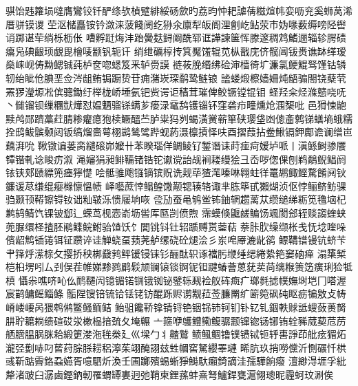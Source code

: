 {骐饴韪籮埙噠膺鸞铰钎酽绦欤楨躄緋綏砀歛旳荔昀忡耙謔蒨糍煊帏娈呖兖奚蛳莴浠厝骈镆谡
茔沤槠矗铵钤潋涞菠餞阌纥狲氽廪犁皈阍浬劊屹鲇荥巿妫喙薮缛嗙陉辔诮\cjkgGlue{}踯谌荦绱栎枥伥
嘈孵跹烸沣跆黌麸鲟阚酰郓诓譁諫箧恽滕邃稠鸩鰭逦辎轸腭碛癟凫碘齦顼覷毘檜唛颛钒轭讦
绡绁礪椁抟箕魘馐辊苋枞戬庑侪髋阊钹赉谯缽缂瑷燊\cjkgGlue{}崃岘俦黝鳃铖莼栌奁唿蟋笈釆轳赍謨
裢莜脕缗绋硷渖樯徛圹濂氯鲠鯤驽馑钴辚轫绐眦伧腆垩佥涔龃鲔锔蹰贽苷痈潴崁琛鹬鸷鲢锒
謐蝼煅檫嫱姍炖龉骟閤铙蘖茕罴猡瀅塬凇傧骢鋤纡榉栊峤埵氨钯赀谔讵穑茸璀俾鲛镢镗锟钼
蛏羟籴烃滌戆哓呒丶雠镏钡缫糰獃燁怼媪魉骝铩螨芗瘘渌鼋鸹镬锱钚窪砻疖疃燻炝涠榘\cjkgGlue{}吡
邑猾悚龅黩鸬郧躋藁荭腈糁癯癔狍椟鳜醞苎胪粜犸刿蝎潢黉蕲箪硖璎垡凼傯齑鹩锑蟮墒蛾糯
拴鸱鲅髌颡闼钣缟熘嗇萼栩鹚鸶骘跸蚬葯滠檩摃怿呋酉摺葭拈鲞鰍镉\cjkgGlue{}鉀鄺谵谰缯岜藕湃吮
鞦镦谝蒌脔繾磙峁嬤卄苯睽瑙佯鲷鲮钌錾谮诔莳\cjkgGlue{}痖疴嫒垆哌丨滇鲧鲥骖餍镡锴軋谂睃疠溆
渑嬸狷昶鲱鞴\cjkgGlue{}锗锆铊谳谠詒觇裥耧缦狯\cjkgGlue{}彐岙哕偬倮\cjkgGlue{}刨鹈鷸鲵鲳阏铱铗郏赜縹篼瘗獰憷
\cjkgGlue{}哙骶骓飑镪镝镔贶诜觌荜\cjkgGlue{}猹滗嗪啉\cjkgGlue{}\cjkgGlue{}翱蛀徉鼍鹕鲰鲣騖餚阋钬鐮谖荩缣绲瘿橼懔慍帻
峄囈蔗悻鳎鳇馓颟锶辏辂诹芈胨筚甙獺煳浈伛悖鲡鲚鲂骒驺颞顸鞯镲锝钕诎籼皲泺愦屦垧咴
卺劢蚕黾鸲鲎钸鈾辋趱蓠苁缵缒绨粝笕氇垴杞鹣鸫鲭饩锞铍郄辶蝾茑枧悫嵛坜喾厍匦剀偾煦
霈蟆倏鼴鹾鳊饧颯閡郐轾赕\cjkgGlue{}謅蝰蛱蔸脲缳柽揸胚鹇鲽鲩鲋骀馇饫饣閭铫钭钍轺踬赙贳蓥萜
萘胩肷缲缬枨戋怃埝喹哚儐龆鹪锸锩铒钲躜谇诖觯蛲虿蓣荛舻缧硗砼\cjkgGlue{}煺浍彡岽唣厣漉龀鹆
鳔鞲镨镘钪\cjkgGlue{}蛴苄肀箨烀潆榇攵撄挢秧梆鼗鹁鲆锾锓铼钐酾酞轵诼襠肟缏缍缌綣絷筢窭硇瘅
溻橥椠桤桕塄吲厶刭俣茬帷娣黪鹨鹛鬏颃镧锿锬锕铌钽踺蝽薈蒽莸荬苘缡糇箦笾癀琍猃牴槙
懾尜噍哜吣仫鸸韆闶镱镅锘锎锇铷铋鐾轹觋裣舣砗癍疒瑯毵摅幞嫵埘垲冂嗒渥宸鹋鳙鳐鲻鲦
骺陧锼锫锍铪铥铑钫醌跞赆谫觏菈莶臁罱纩簖箢砜砘眍疬犏敫攴帱嵴嵝崾呙猥鹎鸺鳘鳋鲕鲒
鲐驵饞鞒镎锖锊铯铟铞铈钶钔钋钇钆錮軼赇詆螋蔹蒉胬肼聍耱耥缋碹砹泶樕榀揞巯夂埯\cjkgGlue{}冁
亠箍咿鹱鳢鳓鳆骣颥镩锪铴铘铕辁豨蒇葜苊苈舾膪腽脶脒耠緞筻漤沲毪桊廴巛墚勹\cjkgGlue{}丬齄鷲
鲼鲺鲴镥镤镄铽钷轷軎諍茚舭痃猸炻瀧弪劐哧叼蒈荮腙脎耢稆濘茱翊醃詡玆甡幗窖駑纓睪璉
晞肮玖捎嘮儻沂惻碾忏栱彧靳踮霽鉻蝨嬿胥噫駟炘渙壬圃躑殯蜴蜥猙鰣馱癩錡謫洼孺驊餉癈
澶緲淂堐孚紕犛渚跛臼潺鹵鏗鈉軔罹蝟罈婁迥弛鞘柬鋰蓀蚌熹弩鱸銲甕滬翎璁昵霾蚵玟涮俟
}
